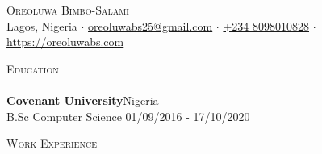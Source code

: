 \documentclass[a4paper]{article}
\newcommand{\lineunder} {
    \vspace*{-8pt} \\
    \hspace*{-18pt} \hrulefill \\
}
\newcommand{\header} [1] {
    {\hspace*{-18pt}\vspace*{6pt} \textsc{#1}}
    \vspace*{-6pt} \lineunder
}
\begin{document}
    \vspace*{-40pt}

\vspace*{-10pt}
\begin{center}
  {\Huge \scshape {Oreoluwa Bimbo-Salami}}\\
  Lagos, Nigeria $\cdot$ \href{mailto:oreoluwabs25@gmail.com}{oreoluwabs25@gmail.com} $\cdot$ \href{tel:+234 8098010828}{+234 8098010828} $\cdot$ \url{https://oreoluwabs.com}\\
\end{center}

      \header{Education}

      \textbf{Covenant University}\hfill Nigeria\\
B.Sc Computer Science \hfill 01/09/2016 - 17/10/2020\\

\vspace{2mm}

      \header{Work Experience}
      \vspace{1mm}
\end{document}

